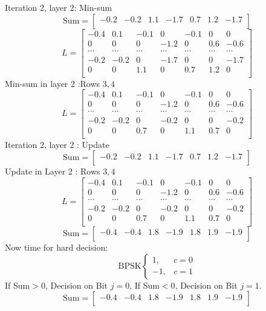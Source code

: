 Iteration 2, layer 2: Min-sum
\[ \text{Sum} = [\begin{matrix}-0.2&-0.2&1.1&-1.7&0.7&1.2&-1.7\\\end{matrix}] \]
\[ L=\left[\begin{matrix}-0.4&0.1&-0.1&0&-0.1&0&0\\0&0&0&-1.2&0&0.6&-0.6\\\cdots&\cdots&\cdots&\cdots&\cdots&\cdots&\cdots\\-0.2&-0.2&0&-1.7&0&0&-1.7\\0&0&1.1&0&0.7&1.2&0\\\end{matrix}\right] \]
Min-sum in layer 2 :Rows $3,4$
\[ L=\left[\begin{matrix}-0.4&0.1&-0.1&0&-0.1&0&0\\0&0&0&-1.2&0&0.6&-0.6\\\cdots&\cdots&\cdots&\cdots&\cdots&\cdots&\cdots\\-0.2&-0.2&0&-0.2&0&0&-0.2\\0&0&0.7&0&1.1&0.7&0\\\end{matrix}\right] \]
Iteration 2, layer 2 : Update
\[ \text{Sum} = [\begin{matrix}-0.2&-0.2&1.1&-1.7&0.7&1.2&-1.7\\\end{matrix}] \]
Update in Layer 2 : Rows $3,4$
\[ L=\left[\begin{matrix}-0.4&0.1&-0.1&0&-0.1&0&0\\0&0&0&-1.2&0&0.6&-0.6\\\cdots&\cdots&\cdots&\cdots&\cdots&\cdots&\cdots\\-0.2&-0.2&0&-0.2&0&0&-0.2\\0&0&0.7&0&1.1&0.7&0\\\end{matrix}\right] \]
\[ \text{Sum} = [\begin{matrix}-0.4&-0.4&1.8&-1.9&1.8&1.9&-1.9\\\end{matrix}] \]
Now time for hard decision:
\begin{equation*}
    \text{BPSK}
    \begin{cases}
        1, & c=0 \\
        -1, & c=1
    \end{cases}
\end{equation*}
If Sum$ > 0$, Decision on Bit $j = 0$, If Sum$ < 0$, Decision on Bit $j = 1$.
\[ \text{Sum} = [\begin{matrix}-0.4&-0.4&1.8&-1.9&1.8&1.9&-1.9\\\end{matrix}] \]

